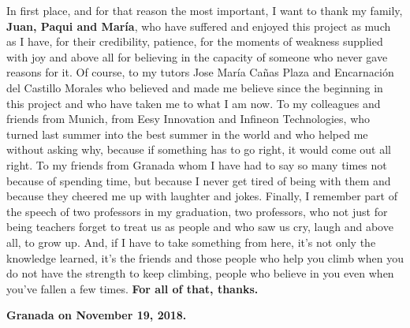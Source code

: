        \vspace{1cm}

In first place, and for that reason the most important, I want to thank my family, {\bf Juan, Paqui and María}, who have suffered and enjoyed this project as much as I have, for their credibility, patience, for the moments of weakness supplied with joy and above all for believing in the capacity of someone who never gave reasons for it.\newline
Of course, to my tutors Jose María Cañas Plaza and Encarnación del Castillo Morales who believed and made me believe since the beginning in this project and who have taken me to what I am now. \newline
To my colleagues and friends from Munich, from Eesy Innovation and Infineon Technologies, who turned last summer into the best summer in the world and who helped me without asking why, because if something has to go right, it would come out all right.\newline
To my friends from Granada whom I have had to say so many times not because of spending time, but because I never get tired of being with them and because they cheered me up with laughter and jokes.\newline
Finally, I remember part of the speech of two professors in my graduation, two professors, who not just for being teachers forget to treat us as people and who saw us cry, laugh and above all, to grow up. And, if I have to take something from here, it's not only the knowledge learned, it's the friends and those people who help you climb when you do not have the strength to keep climbing, people who believe in you even when you've fallen a few times. \newline
{\bf For all of that, thanks.}

\vspace{1cm}

{\bf Granada on November 19, 2018.}

